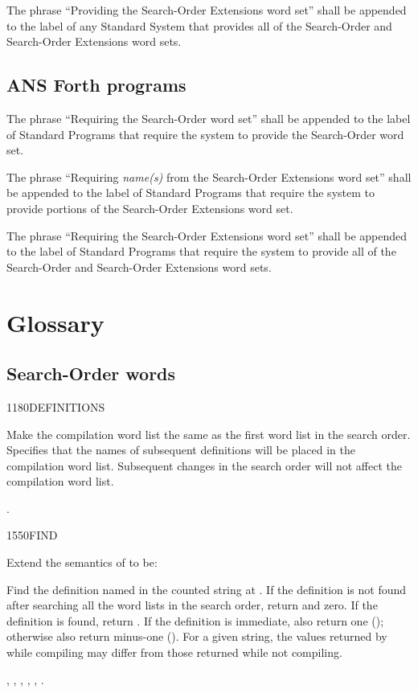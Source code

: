 The phrase ``Providing the Search-Order Extensions word set'' shall
be appended to the label of any Standard System that provides all of
the Search-Order and Search-Order Extensions word sets.

\subsection{ANS Forth programs} %

The phrase ``Requiring the Search-Order word set'' shall be appended
to the label of Standard Programs that require the system to provide
the Search-Order word set.

The phrase ``Requiring \emph{name(s)} from the Search-Order
Extensions word set'' shall be appended to the label of Standard
Programs that require the system to provide portions of the
Search-Order Extensions word set.

The phrase ``Requiring the Search-Order Extensions word set'' shall
be appended to the label of Standard Programs that require the system
to provide all of the Search-Order and Search-Order Extensions word
sets.


\section{Glossary} %

\subsection{Search-Order words} %

\begin{worddef}{1180}{DEFINITIONS}
\item \stack{}{}

	Make the compilation word list the same as the first word list
	in the search order. Specifies that the names of subsequent
	definitions will be placed in the compilation word list.
	Subsequent changes in the search order will not affect the
	compilation word list.

\see {}.
\end{worddef}


\begin{worddef}{1550}{FIND}
\item Extend the semantics of  to be:


	Find the definition named in the counted string at .
	If the definition is not found after searching all the word lists
	in the search order, return  and zero. If
	the definition is found, return . If the definition is
	immediate, also return one (); otherwise also return
	minus-one (). For a given string, the values returned
	by  while compiling may differ from those returned
	while not compiling.

\see {},
	,
	,
	,
	,
	.
\end{worddef}


